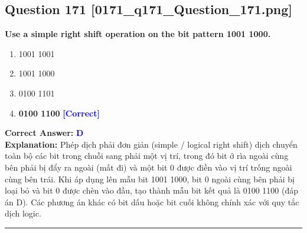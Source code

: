 \documentclass[11pt,a4paper]{article}
\begin{document}
\begin{minipage}{\textwidth}
\subsection*{Question 171 \quad \footnotesize{[0171\_q171\_Question\_171.png]}}
\noindent \textbf{Use a simple right shift operation on the bit pattern 1001 1000.}

\begin{enumerate}[label=\Alph*.]
    \item 1001 1001
    \item 1001 1000
    \item 0100 1101
    \item \textbf{0100 1100} \hfill \textcolor{blue}{\textbf{[Correct]}}
\end{enumerate}

\noindent \textbf{Correct Answer:} \textcolor{blue}{\textbf{D}} \\[2pt]
\noindent \textbf{Explanation:} Phép dịch phải đơn giản (simple / logical right shift) dịch chuyển toàn bộ các bit trong chuỗi sang phải một vị trí, trong đó bit ở rìa ngoài cùng bên phải bị đẩy ra ngoài (mất đi) và một bit 0 được điền vào vị trí trống ngoài cùng bên trái. Khi áp dụng lên mẫu bit 1001 1000, bit 0 ngoài cùng bên phải bị loại bỏ và bit 0 được chèn vào đầu, tạo thành mẫu bit kết quả là 0100 1100 (đáp án D). Các phương án khác có bit dấu hoặc bit cuối không chính xác với quy tắc dịch logic.

\par\vspace{0.3cm}
\hrule
\vspace{0.3cm}
\end{minipage}
\end{document}
